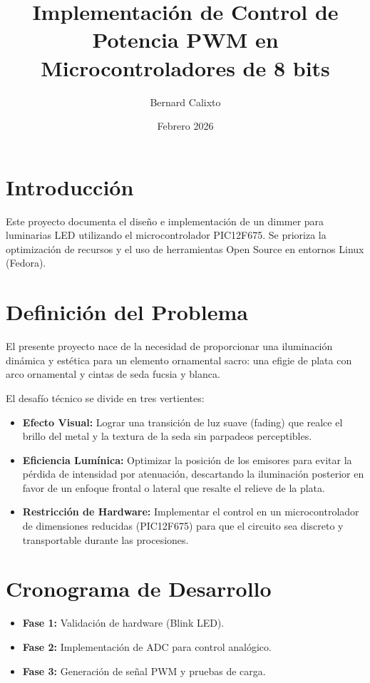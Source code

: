 \documentclass[12pt,a4paper]{article}
\title{Implementación de Control de Potencia PWM en Microcontroladores de 8 bits}
\author{Bernard Calixto}
\date{Febrero 2026}
\begin{document}
\maketitle

\section{Introducción}
Este proyecto documenta el diseño e implementación de un dimmer para luminarias LED utilizando el microcontrolador PIC12F675. Se prioriza la optimización de recursos y el uso de herramientas Open Source en entornos Linux (Fedora).

\section{Definición del Problema}
El presente proyecto nace de la necesidad de proporcionar una iluminación dinámica y estética para un elemento ornamental sacro: una efigie de plata con arco ornamental y cintas de seda fucsia y blanca. 

El desafío técnico se divide en tres vertientes:
\begin{itemize}
    \item \textbf{Efecto Visual:} Lograr una transición de luz suave (fading) que realce el brillo del metal y la textura de la seda sin parpadeos perceptibles.
    \item \textbf{Eficiencia Lumínica:} Optimizar la posición de los emisores para evitar la pérdida de intensidad por atenuación, descartando la iluminación posterior en favor de un enfoque frontal o lateral que resalte el relieve de la plata.
    \item \textbf{Restricción de Hardware:} Implementar el control en un microcontrolador de dimensiones reducidas (PIC12F675) para que el circuito sea discreto y transportable durante las procesiones.
\end{itemize}

\section{Cronograma de Desarrollo}
\begin{itemize}
    \item \textbf{Fase 1:} Validación de hardware (Blink LED).
    \item \textbf{Fase 2:} Implementación de ADC para control analógico.
    \item \textbf{Fase 3:} Generación de señal PWM y pruebas de carga.
\end{itemize}
\end{document}
